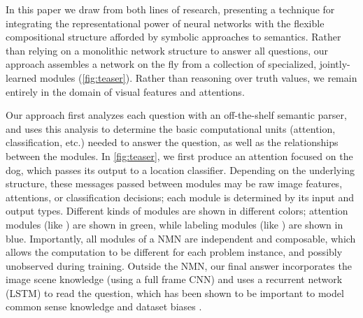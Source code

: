 In this paper we draw from both lines of research, presenting a technique for
integrating the representational power of neural networks with the flexible
compositional structure afforded by symbolic approaches to semantics.  Rather
than relying on a monolithic network structure to answer all questions, our
approach assembles a network on the fly from a collection of specialized,
jointly-learned modules (\autoref{fig:teaser}). Rather than reasoning over
truth values, we remain entirely in the domain of visual features and
attentions.

Our approach first analyzes
each question with an off-the-shelf semantic parser, and uses this analysis to
determine the basic computational units (attention, classification, etc.) needed
to answer the question, as well as the relationships between the modules. In
\autoref{fig:teaser}, we first produce an attention focused on the dog, which
passes its output to
a location classifier. Depending on the underlying structure, these messages
passed between modules may be raw image features, attentions, or classification
decisions; each module is determined by its input and output types.
Different kinds of modules are shown in different colors; attention modules
(like ) are shown in green, while labeling modules (like
) are shown in blue.
Importantly, all modules of a NMN are independent and composable, which allows
the computation to be different for each problem instance, and possibly
unobserved during training. 
Outside the NMN, our final answer incorporates the image scene knowledge
(using a full frame CNN) and uses a recurrent network (LSTM) to read the
question, which has been shown to be important to model common sense knowledge
and dataset biases \cite{malinowski15iccv}.


